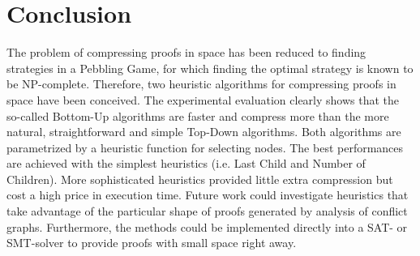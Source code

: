 \section{Conclusion}
\label{sec:conclusion}

The problem of compressing proofs in space has been reduced to finding strategies in a Pebbling Game, 
for which finding the optimal strategy is known to be NP-complete.
Therefore, two heuristic algorithms for compressing proofs in space have been conceived. 
The experimental evaluation clearly shows that the so-called Bottom-Up algorithms are faster and compress more than the more natural, 
straightforward and simple Top-Down algorithms. 
Both algorithms are parametrized by a heuristic function for selecting nodes. 
The best performances are achieved with the simplest heuristics (i.e. Last Child and Number of Children). 
More sophisticated heuristics provided little extra compression but cost a high price in execution time. 
Future work could investigate heuristics that take advantage of the particular shape of proofs generated by analysis of conflict graphs.
Furthermore, the methods could be implemented directly into a SAT- or SMT-solver to provide proofs with small space right away.

\vspace{-5pt}

\vspace{-5pt}

